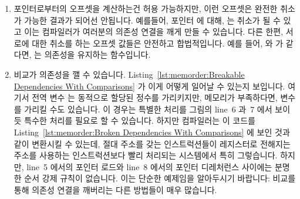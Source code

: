 \begin{enumerate}
\item	포인터로부터의 오프셋을 계산하는건 허용 가능하지만, 이런 오프셋은
	완전한 취소가 가능한 결과가 되어선 안됩니다.
	예를들어,  포인터  에 대해,  는
	취소가 될 수 있고 이는 컴파일러가 여러분의 의존성 연결을 깨게 만들 수
	있습니다.
	다른 한편, 서로에 대한 취소를 하는 오프셋 값들은 안전하고 합법적입니다.
	예를 들어,  와  가 같다면,  는 의존성을 유지하는
	함수입니다.

\item	비교가 의존성을 깰 수 있습니다.
	Listing~\ref{lst:memorder:Breakable Dependencies With Comparisons}
	가 이게 어떻게 일어날 수 있는지 보입니다.
	여기서 전역 변수  는 동적으로 할당된 정수를 가리키지만, 메모리가
	부족하다면,  변수를 가리킬 수도 있습니다.
	이  경우는 특별한 처리를 그림의 line~6 과~7 에서 보이듯
		특수한 처리를 필요로 할 수 있습니다.
	하지만 컴파일러는 이 코드를
	Listing~\ref{lst:memorder:Broken Dependencies With Comparisons}
	에 보인 것과 같이 변환시킬 수 있는데, 절대 주소를 갖는 인스트럭션들이
	레지스터로 전해지는 주소를 사용하는 인스트럭션보다 빨리 처리되는
	시스템에서 특히 그렇습니다.
	하지만, line~5 에서의 포인터 로드와 line~8 에서의 포인터 디레처런스
	사이에는 분명한 순서 강제 규칙이 없습니다.
	이는 단순한 예제임을 알아두시기 바랍니다: 비교를 통해 의존성 연결을
	깨버리는 다른 방법들이 매우 많습니다.

\end{enumerate}

